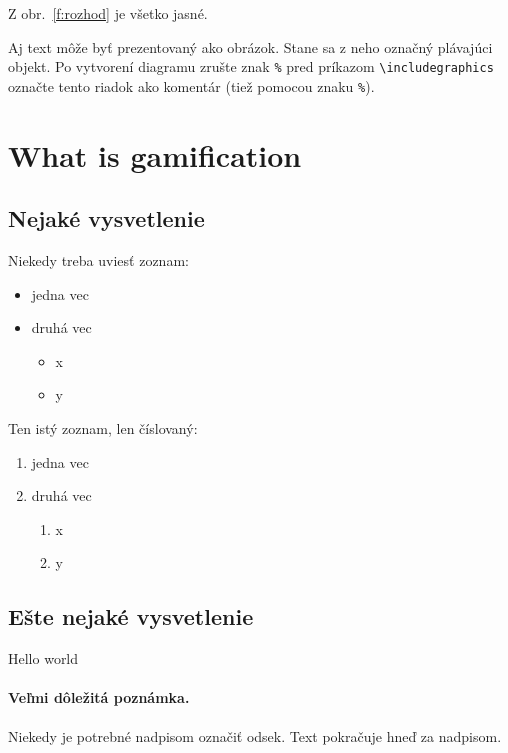 \documentclass[10pt,twoside,english,a4paper]{article}
\begin{document}
Z obr.~\ref{f:rozhod} je všetko jasné. 

\begin{figure*}[tbh]
\centering
Aj text môže byť prezentovaný ako obrázok. Stane sa z neho označný plávajúci objekt. Po vytvorení diagramu zrušte znak \texttt{\%} pred príkazom \verb|\includegraphics| označte tento riadok ako komentár (tiež pomocou znaku \texttt{\%}).
\caption{Rozhodujúci argument.}
\label{f:rozhod}
\end{figure*}



\section{What is gamification} \label{section3}

\subsection{Nejaké vysvetlenie} \label{section3}

Niekedy treba uviesť zoznam:

\begin{itemize}
\item jedna vec
\item druhá vec
	\begin{itemize}
	\item x
	\item y
	\end{itemize}
\end{itemize}

Ten istý zoznam, len číslovaný:

\begin{enumerate}
\item jedna vec
\item druhá vec
	\begin{enumerate}
	\item x
	\item y
	\end{enumerate}
\end{enumerate}


\subsection{Ešte nejaké vysvetlenie} \label{section3}
Hello world

\paragraph{Veľmi dôležitá poznámka.}
Niekedy je potrebné nadpisom označiť odsek. Text pokračuje hneď za nadpisom.
\end{document}
